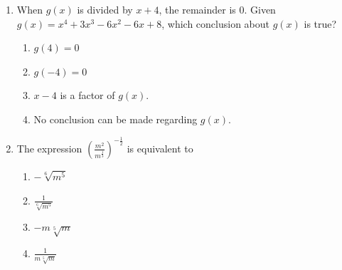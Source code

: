 \documentclass[12pt, oneside]{article}
\begin{document}
\begin{enumerate}
\item When $g(x)$ is divided by $x+4$, the remainder is 0. Given $g(x)= x^4+3x^3-6x^2-6x+8$, which conclusion about $g(x)$ is true?
\begin{enumerate}
    \item $g(4)=0$
    \item $g(-4)=0$
    \item $x-4$ is a factor of $g(x)$.
    \item No conclusion can be made regarding $g(x)$.
\end{enumerate} %

\item The expression $\displaystyle \left( \frac{m^2}{m^\frac{1}{3}}\right)^{-\frac{1}{2}}$ is equivalent to 
\begin{enumerate}
    \item $-\sqrt[6]{m^5}$
    \item $\displaystyle \frac{1}{\sqrt[6]{m^5}}$
    \item $-m \sqrt[5]{m}$
    \item $\displaystyle \frac{1}{m \sqrt[5]{m}}$
\end{enumerate} %


\end{enumerate}
\end{document}
